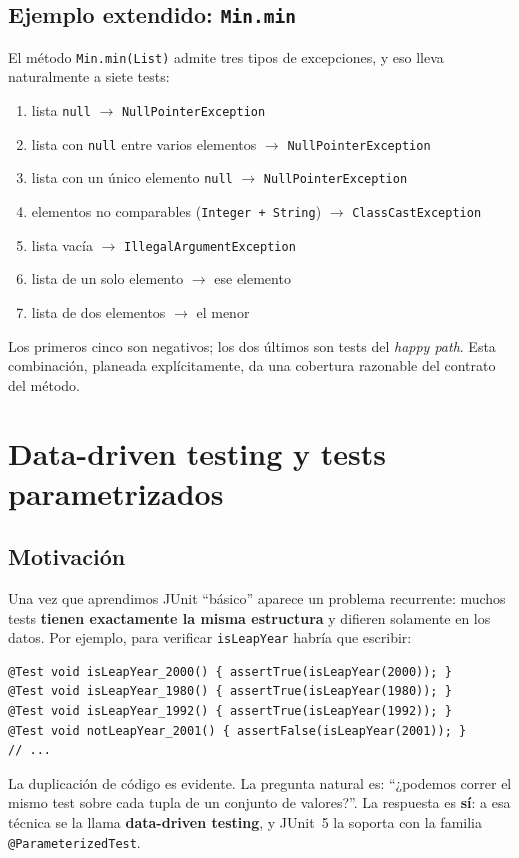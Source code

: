 \documentclass[12pt,a4paper]{article}
\begin{document}
\subsection{Ejemplo extendido: \texttt{Min.min}}
El método \texttt{Min.min(List)} admite tres tipos de excepciones, y eso lleva naturalmente a siete tests:
\begin{enumerate}
  \item lista \texttt{null} $\rightarrow$ \texttt{NullPointerException}
  \item lista con \texttt{null} entre varios elementos $\rightarrow$ \texttt{NullPointerException}
  \item lista con un único elemento \texttt{null} $\rightarrow$ \texttt{NullPointerException}
  \item elementos no comparables (\texttt{Integer + String}) $\rightarrow$ \texttt{ClassCastException}
  \item lista vacía $\rightarrow$ \texttt{IllegalArgumentException}
  \item lista de un solo elemento $\rightarrow$ ese elemento
  \item lista de dos elementos $\rightarrow$ el menor
\end{enumerate}
Los primeros cinco son negativos; los dos últimos son tests del \textit{happy path}. Esta combinación, planeada explícitamente, da una cobertura razonable del contrato del método.

\section{Data-driven testing y tests parametrizados}

\subsection{Motivación}
Una vez que aprendimos JUnit ``básico'' aparece un problema recurrente: muchos tests \textbf{tienen exactamente la misma estructura} y difieren solamente en los datos. Por ejemplo, para verificar \texttt{isLeapYear} habría que escribir:
\begin{lstlisting}[style=javastyle]
@Test void isLeapYear_2000() { assertTrue(isLeapYear(2000)); }
@Test void isLeapYear_1980() { assertTrue(isLeapYear(1980)); }
@Test void isLeapYear_1992() { assertTrue(isLeapYear(1992)); }
@Test void notLeapYear_2001() { assertFalse(isLeapYear(2001)); }
// ...
\end{lstlisting}
La duplicación de código es evidente. La pregunta natural es: ``¿podemos correr el mismo test sobre cada tupla de un conjunto de valores?''. La respuesta es \textbf{sí}: a esa técnica se la llama \textbf{data-driven testing}, y JUnit~5 la soporta con la familia \texttt{@ParameterizedTest}.
\end{document}
